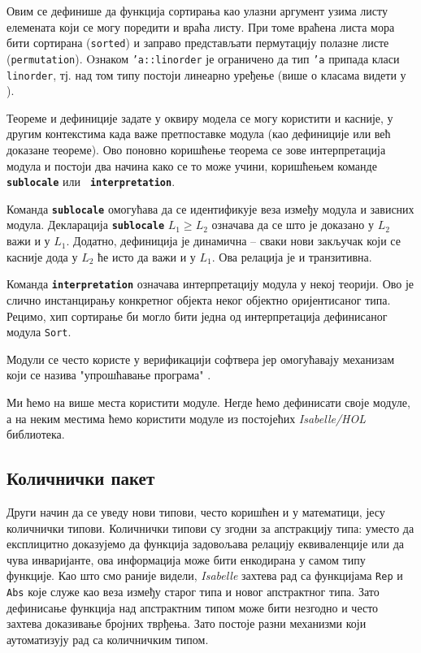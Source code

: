 Овим се дефинише да функција сортирања као улазни аргумент узима листу
елемената који се могу поредити и враћа листу. При томе враћена листа
мора бити сортирана ({\tt sorted}) и заправо представљати пермутацију
полазне листе ({\tt permutation}). Oзнаком {\tt 'a::linorder} је
ограничено да тип {\tt 'a} припада класи {\tt linorder}, тј. над том
типу постоји линеарно уређење (више о класама видети у
\cite{haftmann2006constructive}).

Теореме и дефиниције задате у оквиру модела се могу користити и
касније, у другим контекстима када важе претпоставке модула (као
дефиниције или већ доказане теореме). Ово поновно коришћење теорема се
зове интерпретација модула и постоји два начина како се то може учини,
коришћењем команде {\tt \textbf{sublocale}} или {\tt
  \textbf{interpretation}}.

Команда {\tt \textbf{sublocale}} омогућава да се идентификује веза
између модула и зависних модула. Декларација {\tt \textbf{sublocale}}
$L_1 \ge L_2$ означава да се што је доказано у $L_2$ важи и у
$L_1$. Додатно, дефиниција је динамична -- сваки нови закључак који се
касније дода у $L_2$ ће исто да важи и у $L_1$. Ова релација је и
транзитивна.

Команда {\tt \textbf{interpretation}} означава интерпретацију модула у
некој теорији. Ово је слично инстанцирању конкретног објекта неког
објектно оријентисаног типа. Рецимо, хип сортирање би могло бити једна
од интерпретација дефинисаног модула {\tt Sort}.




Модули се често користе у верификацији софтвера јер омогућавају
ме\-ха\-ни\-зам који се назива "упрошћавање програма"
\cite{refinement}.

Ми ћемо на више места користити модуле. Негде ћемо дефинисати своје
модуле, а на неким местима ћемо користити модуле из постојећих
\emph{Isabelle/HOL} библиотека.


\subsection{Количнички пакет}

Други начин да се уведу нови типови, често коришћен и у математици,
јесу количнички типови. Количнички типови су згодни за апстракцију
типа: уместо да експлицитно доказујемо да функција задовољава релацију
еквиваленције или да чува инваријанте, ова информација може бити
енкодирана у самом типу функције. Као што смо раније видели,
\emph{Isabelle} захтева рад са функцијама {\tt Rep} и {\tt Abs} које
служе као веза између старог типа и новог апстрактног типа. Зато
дефинисање функција над апстрактним типом може бити незгодно и често
захтева доказивање бројних тврђења. Зато постоје разни механизми који
аутоматизују рад са количничким типом.

